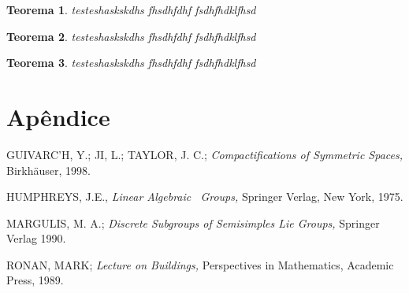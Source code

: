 \documentclass[twoside,openright,titlepage,numbers=noenddot,headinclude,  lineheaders footinclude=true,cleardoublepage=empty,
                                BCOR=5mm,paper=a4,fontsize=12pt ]{scrbook}
\newtheorem{teo}{Teorema}[chapter]
\begin{document}
\begin{teo}
 testeshaskskdhs fhsdhfdhf fsdhfhdklfhsd
\end{teo}
\begin{teo}
 testeshaskskdhs fhsdhfdhf fsdhfhdklfhsd
\end{teo}\begin{teo}
 testeshaskskdhs fhsdhfdhf fsdhfhdklfhsd
\end{teo}



\backmatter
\appendix
\chapter{Ap\^endice}





\begin{thebibliography}{9999}  
GUIVARC'H, Y.; JI, L.; TAYLOR, J. C.;
\emph{Compactifications of Symmetric Spaces, }Birkh\"{a}user, 1998.

HUMPHREYS, J.E., \emph{Linear Algebraic \ Groups, }Springer
Verlag, New York, 1975.

MARGULIS, M. A.; \emph{Discrete Subgroups of Semisimples
Lie Groups, }Springer Verlag 1990.

RONAN, MARK; \emph{Lecture on Buildings, }Perspectives in
Mathematics, Academic Press, 1989.
\end{thebibliography}



\clearpage
{}
{}
\printindex
\end{document}
